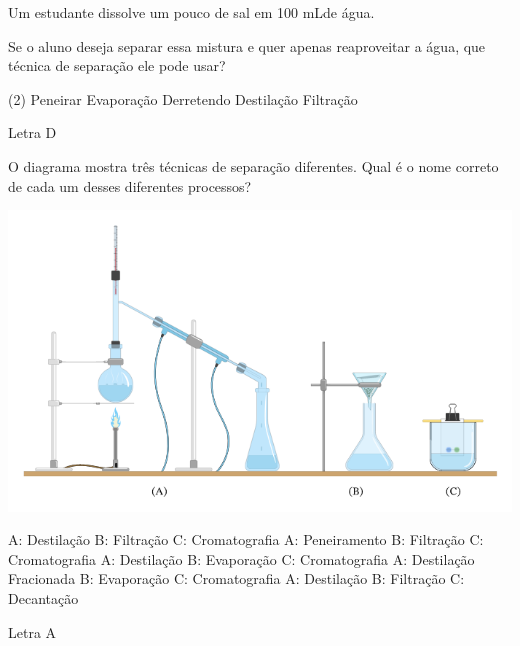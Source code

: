 \documentclass[11pt]{article}
\begin{document}
\begin{exercise}
Um estudante dissolve um pouco de sal em 100 mLde água.

Se o aluno deseja separar essa mistura e quer apenas reaproveitar a água, que técnica de separação ele pode usar?

\begin{choice}(2)
\choice Peneirar
\choice Evaporação
\choice Derretendo
\choice Destilação
\choice Filtração
\end{choice}
\end{exercise}
\begin{solution}
Letra D
\end{solution}



\begin{exercise}
O diagrama mostra três técnicas de separação diferentes. Qual é o nome correto de cada um desses diferentes processos?

\begin{center}
\includegraphics[scale=0.3]{../Listas/destilador.png}
\end{center}

\begin{choice}
\choice A: Destilação B: Filtração C: Cromatografia
\choice A: Peneiramento B: Filtração C: Cromatografia
\choice A: Destilação B: Evaporação C: Cromatografia
\choice A: Destilação Fracionada B: Evaporação C: Cromatografia
\choice A: Destilação B: Filtração C: Decantação
\end{choice}
\end{exercise}
\begin{solution}
Letra A
\end{solution}
\end{document}
